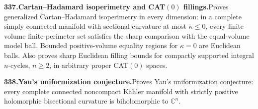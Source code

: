 \documentclass[11pt,a4paper]{article}
\begin{document}
  \par \begin{minipage}{\linewidth}
  \fontsize{10.5}{12.6}\selectfont\RaggedRight
  \hypertarget{result 337}{}
  {\bfseries\textcolor{muted}{337.}\enspace Cartan--Hadamard isoperimetry and CAT$(0)$ fillings.}\enspace Proves generalized Cartan--Hadamard isoperimetry in every dimension: in a complete simply connected manifold with sectional curvature at most $\kappa\le0$, every finite-volume finite-perimeter set satisfies the sharp comparison with the equal-volume model ball. Bounded positive-volume equality regions for $\kappa=0$ are Euclidean balls. Also proves sharp Euclidean filling bounds for compactly supported integral $n$-cycles, $n\ge2$, in arbitrary proper CAT$(0)$ spaces.\par
  \end{minipage}\par\vspace{5pt}



  \par \begin{minipage}{\linewidth}
  \fontsize{10.5}{12.6}\selectfont\RaggedRight
  \hypertarget{result 338}{}
  {\bfseries\textcolor{muted}{338.}\enspace Yau's uniformization conjecture.}\enspace Proves Yau's uniformization conjecture: every complete connected noncompact K\"ahler manifold with strictly positive holomorphic bisectional curvature is biholomorphic to $\mathbb C^n$.\par
  \end{minipage}\par\vspace{5pt}
\end{document}
